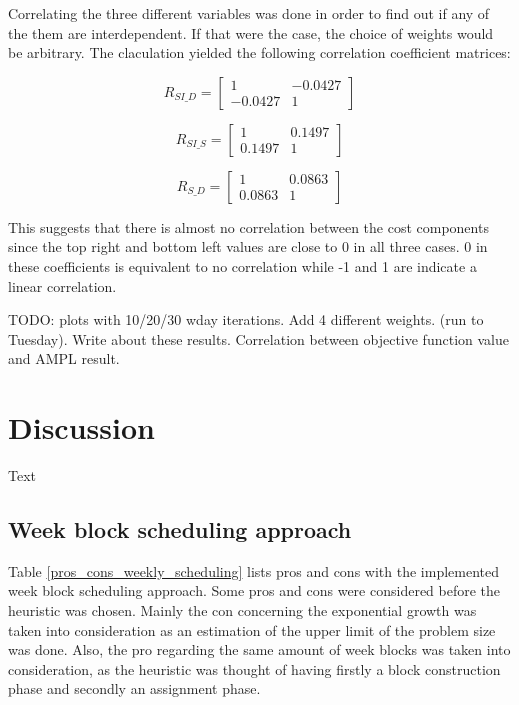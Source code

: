 Correlating the three different variables was done in order to find out if any of the them are interdependent. If that were the case, the choice of weights would be arbitrary. The claculation yielded the following correlation coefficient matrices:

\begin{equation}
  R_{SI\_D} =
  \begin{bmatrix}
 	 1  &  -0.0427 \\
 	 -0.0427  &  1
 \end{bmatrix}
\end{equation}

 \begin{equation}
 R_{SI\_S} =
 \begin{bmatrix}
	 1  &  0.1497 \\
	 0.1497  &  1
 \end{bmatrix}
 \end{equation}
 
\begin{equation}
 R_{S\_D} =
 \begin{bmatrix}
	 1  &  0.0863 \\
	 0.0863  &  1
 \end{bmatrix}
 \end{equation} 
 
 This suggests that there is almost no correlation between the cost components since the top right and bottom left values are close to 0 in all three cases. 0 in these coefficients is equivalent to no correlation while -1 and 1 are indicate a linear correlation. 
 
TODO: plots with 10/20/30 wday iterations. Add 4 different weights. (run to Tuesday).
Write about these results. Correlation between objective function value and AMPL result.

\section{Discussion}
Text


\subsection{Week block scheduling approach}
Table \ref{pros_cons_weekly_scheduling} lists pros and cons with the implemented week block scheduling approach. Some pros and cons were considered before the heuristic was chosen. Mainly the con concerning the exponential growth was taken into consideration as an estimation of the upper limit of the problem size was done. Also, the pro regarding the same amount of week blocks was taken into consideration, as the heuristic was thought of having firstly a block construction phase and secondly an assignment phase. 

